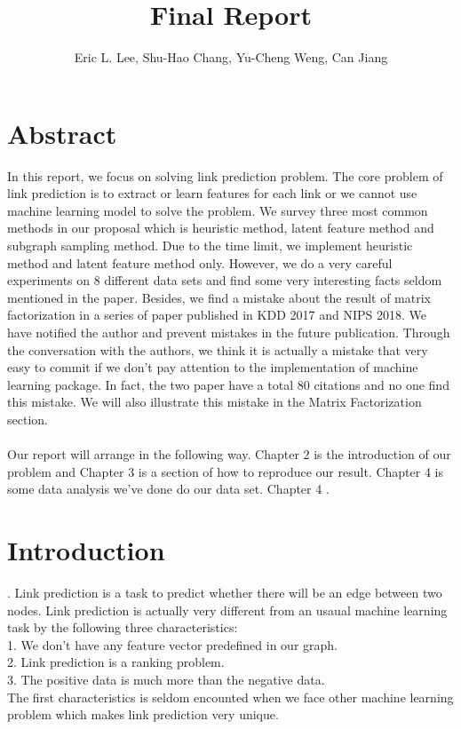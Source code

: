 \documentclass[12pt]{article}
\begin{document}
 
\title{Final Report}
\author{Eric L. Lee, Shu-Hao Chang, Yu-Cheng Weng, Can Jiang} 
\maketitle

\section{Abstract}

In this report, we focus on solving link prediction problem. The core problem of link prediction is to extract or learn features for each link or we cannot use machine learning model to solve the problem. We survey three most common methods in our proposal which is heuristic method, latent feature method and subgraph sampling method.
Due to the time limit, we implement heuristic method and latent feature method only. However, we do a very careful experiments on 8 different data sets and find some very interesting facts seldom mentioned in the paper.  Besides, we find a mistake about the result of matrix factorization in a series of paper published in KDD 2017 and NIPS 2018. We have notified the author and prevent mistakes in the future publication. Through the conversation with the authors, we think it is actually a mistake that very easy to commit if we don't pay attention to the implementation of machine learning package. In fact, the two paper have a total 80 citations and no one find this mistake. We will also illustrate this mistake in the Matrix Factorization section.
\\ \\
Our report will arrange in the following way. Chapter 2 is the introduction of our problem and Chapter 3 is a section of how to reproduce our result. Chapter 4 is some data analysis we've done do our data set. Chapter 4 .

\section{Introduction}.
Link prediction is a task to predict whether there will be an edge between two nodes. Link prediction is actually very different from an usaual machine learning task by the following three characteristics:
\\
1. We don't have any feature vector predefined in our graph. 
\\
2. Link prediction is a ranking problem.
\\
3. The positive data is much more than the negative data. 
\\ 
The first characteristics is seldom encounted when we face other machine learning problem which makes link prediction very unique. 
\end{document}

